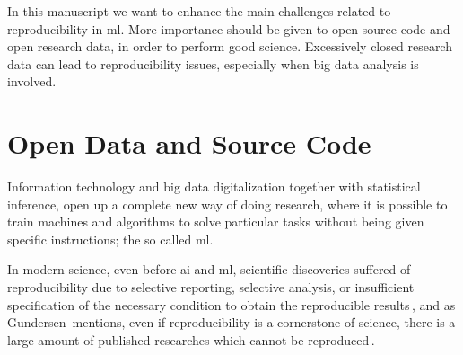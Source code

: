 In this manuscript we want to enhance the main challenges related to reproducibility
in \ac{ml}. More importance should be given to open source
code and open research data, in order to perform good science.
Excessively closed research data can lead to reproducibility issues,
especially when big data analysis is involved.

\section{Open Data and Source Code}
%
Information technology and big data digitalization together with statistical inference,
open up a complete new way of doing research, where it is possible to train machines
and algorithms to solve particular tasks without being given specific instructions; the so called
\ac{ml}.

In modern science, even before \ac{ai} and \ac{ml}, scientific discoveries suffered of reproducibility due
to selective reporting, selective analysis, or insufficient specification of the necessary condition to obtain the
reproducible results\,\cite{aarts2016reproducibility}, and as Gundersen\,\cite{gundersen2018state}
mentions, even if reproducibility is a cornerstone of science, there is a large amount of published
researches which cannot be reproduced\,\cite{begley2012drug, begley2015reproducibility, prinz2011believe}.

